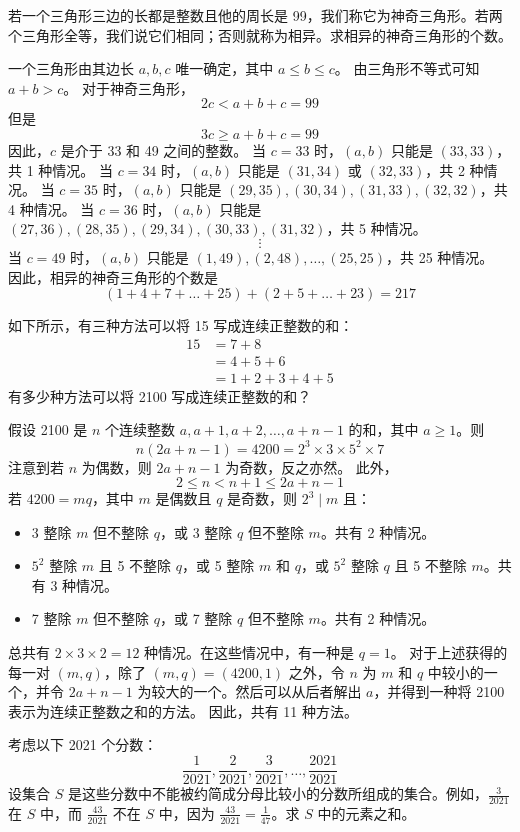 \begin{questions}
\question 若一个三角形三边的长都是整数且他的周长是 99，我们称它为神奇三角形。若两个三角形全等，我们说它们相同；否则就称为相异。求相异的神奇三角形的个数。

\begin{solution}
一个三角形由其边长 $a, b, c$ 唯一确定，其中 $a \le b \le c$。
由三角形不等式可知 $a + b > c$。
对于神奇三角形，
\[ 2c < a + b + c = 99 \]
但是
\[ 3c \ge a + b + c = 99 \]
因此，$c$ 是介于 33 和 49 之间的整数。
当 $c = 33$ 时，$(a, b)$ 只能是 $(33, 33)$，共 1 种情况。
当 $c = 34$ 时，$(a, b)$ 只能是 $(31, 34)$ 或 $(32, 33)$，共 2 种情况。
当 $c = 35$ 时，$(a, b)$ 只能是 $(29, 35), (30, 34), (31, 33), (32, 32)$，共 4 种情况。
当 $c = 36$ 时，$(a, b)$ 只能是 $(27, 36), (28, 35), (29, 34), (30, 33), (31, 32)$，共 5 种情况。
\[ \vdots \]
当 $c = 49$ 时，$(a, b)$ 只能是 $(1, 49), (2, 48), \dots, (25, 25)$，共 25 种情况。
因此，相异的神奇三角形的个数是
\[ (1 + 4 + 7 + \dots + 25) + (2 + 5 + \dots + 23) = 217 \]
\end{solution}

\question 如下所示，有三种方法可以将 15 写成连续正整数的和：
\begin{align}
15 &= 7 + 8 \\
&= 4 + 5 + 6 \\
&= 1 + 2 + 3 + 4 + 5
\end{align}
有多少种方法可以将 2100 写成连续正整数的和？

\begin{solution}
假设 2100 是 $n$ 个连续整数 $a, a + 1, a + 2, \dots, a + n - 1$ 的和，其中 $a \ge 1$。则
\[ n(2a + n - 1) = 4200 = 2^{3} \times 3 \times 5^{2} \times 7 \]
注意到若 $n$ 为偶数，则 $2a + n - 1$ 为奇数，反之亦然。
此外，
\[ 2 \le n < n + 1 \le 2a + n - 1 \]
若 $4200 = mq$，其中 $m$ 是偶数且 $q$ 是奇数，则 $2^{3} \mid m$ 且：
\begin{itemize}
    \item 3 整除 $m$ 但不整除 $q$，或 3 整除 $q$ 但不整除 $m$。共有 2 种情况。
    \item $5^{2}$ 整除 $m$ 且 5 不整除 $q$，或 5 整除 $m$ 和 $q$，或 $5^{2}$ 整除 $q$ 且 5 不整除 $m$。共有 3 种情况。
    \item 7 整除 $m$ 但不整除 $q$，或 7 整除 $q$ 但不整除 $m$。共有 2 种情况。
\end{itemize}
总共有 $2 \times 3 \times 2 = 12$ 种情况。在这些情况中，有一种是 $q = 1$。
对于上述获得的每一对 $(m, q)$，除了 $(m, q) = (4200, 1)$ 之外，令 $n$ 为 $m$ 和 $q$ 中较小的一个，并令 $2a + n - 1$ 为较大的一个。然后可以从后者解出 $a$，并得到一种将 2100 表示为连续正整数之和的方法。
因此，共有 11 种方法。
\end{solution}
\question 考虑以下 2021 个分数：
\[ \frac{1}{2021}, \frac{2}{2021}, \frac{3}{2021}, \dots, \frac{2021}{2021} \]
设集合 $S$ 是这些分数中不能被约简成分母比较小的分数所组成的集合。例如，$\frac{3}{2021}$ 在 $S$ 中，而 $\frac{43}{2021}$ 不在 $S$ 中，因为 $\frac{43}{2021} = \frac{1}{47}$。求 $S$ 中的元素之和。


\end{questions}
